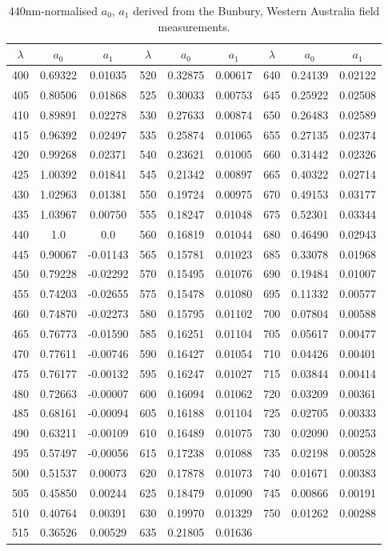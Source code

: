 \documentclass[12pt]{article}
\numberwithin{equation}{section}
\begin{document}
\begin{table}[H]
\centering
\caption{440nm-normalised $a_0$, $a_1$ derived from the Bunbury, Western Australia 
field measurements.}
\begin{tabular}{ccc|ccc|ccc}
 $\lambda$ & $a_0$ & $a_1$ & $\lambda$ & $a_0$ & $a_1$ & $\lambda$ & $a_0$ & $a_1$ \\
 \hline 
 400 & 0.69322 & 0.01035 & 520 & 0.32875 & 0.00617 & 640 & 0.24139 & 0.02122 \\
 405 & 0.80506 & 0.01868 & 525 & 0.30033 & 0.00753 & 645 & 0.25922 & 0.02508 \\
 410 & 0.89891 & 0.02278 & 530 & 0.27633 & 0.00874 & 650 & 0.26483 & 0.02589 \\
 415 & 0.96392 & 0.02497 & 535 & 0.25874 & 0.01065 & 655 & 0.27135 & 0.02374 \\
 420 & 0.99268 & 0.02371 & 540 & 0.23621 & 0.01005 & 660 & 0.31442 & 0.02326 \\
 425 & 1.00392 & 0.01841 & 545 & 0.21342 & 0.00897 & 665 & 0.40322 & 0.02714 \\
 430 & 1.02963 & 0.01381 & 550 & 0.19724 & 0.00975 & 670 & 0.49153 & 0.03177 \\
 435 & 1.03967 & 0.00750 & 555 & 0.18247 & 0.01048 & 675 & 0.52301 & 0.03344 \\
 440 & 1.0 & 0.0 & 560 & 0.16819 & 0.01044 & 680 & 0.46490 & 0.02943 \\
 445 & 0.90067 & -0.01143 & 565 & 0.15781 & 0.01023 & 685 & 0.33078 & 0.01968 \\
 450 & 0.79228 & -0.02292 & 570 & 0.15495 & 0.01076 & 690 & 0.19484 & 0.01007 \\
 455 & 0.74203 & -0.02655 & 575 & 0.15478 & 0.01080 & 695 & 0.11332 & 0.00577 \\
 460 & 0.74870 & -0.02273 & 580 & 0.15795 & 0.01102 & 700 & 0.07804 & 0.00588 \\
 465 & 0.76773 & -0.01590 & 585 & 0.16251 & 0.01104 & 705 & 0.05617 & 0.00477 \\
 470 & 0.77611 & -0.00746 & 590 & 0.16427 & 0.01054 & 710 & 0.04426 & 0.00401 \\
 475 & 0.76177 & -0.00132 & 595 & 0.16247 & 0.01027 & 715 & 0.03844 & 0.00414 \\
 480 & 0.72663 & -0.00007 & 600 & 0.16094 & 0.01062 & 720 & 0.03209 & 0.00361 \\
 485 & 0.68161 & -0.00094 & 605 & 0.16188 & 0.01104 & 725 & 0.02705 & 0.00333 \\
 490 & 0.63211 & -0.00109 & 610 & 0.16489 & 0.01075 & 730 & 0.02090 & 0.00253 \\
 495 & 0.57497 & -0.00056 & 615 & 0.17238 & 0.01088 & 735 & 0.02198 & 0.00528 \\
 500 & 0.51537 & 0.00073 & 620 & 0.17878 & 0.01073 & 740 & 0.01671 & 0.00383 \\
 505 & 0.45850 & 0.00244 & 625 & 0.18479 & 0.01090 & 745 & 0.00866 & 0.00191 \\
 510 & 0.40764 & 0.00391 & 630 & 0.19970 & 0.01329 & 750 & 0.01262 & 0.00288 \\
 515 & 0.36526 & 0.00529 & 635 & 0.21805 & 0.01636 &  &  &  \\
\end{tabular}
\end{table}
\end{document}
